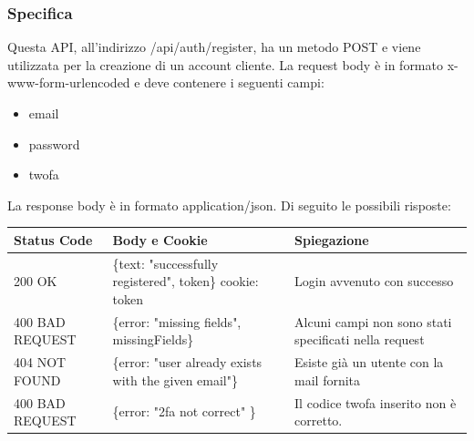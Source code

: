 \documentclass{report}
\begin{document}
\subsubsection*{Specifica}
Questa API, all'indirizzo /api/auth/register, ha un metodo POST e viene utilizzata per la creazione di un account cliente.
La request body è in formato x-www-form-urlencoded e deve contenere i seguenti campi:
\begin{itemize}
	\item email
	\item password
	\item twofa
\end{itemize}
La response body è in formato application/json. Di seguito le possibili risposte:
\begin{center} %
	\centering
	\begin{tabular}{ |p{4cm}|p{5cm}|p{4cm}| }
		\hline
		\centering Status Code & \qquad\quad Body e Cookie                                & \qquad\qquad Spiegazione                              \\ %
		\hline
		200 OK                 & \{text: "successfully registered", token\} cookie: token & Login avvenuto con successo                           \\
		\hline
		400 BAD REQUEST        & \{error: "missing fields", missingFields\}               & Alcuni campi non sono stati specificati nella request \\ %
		\hline
		404 NOT FOUND          & \{error: "user already exists with the given email"\}    & Esiste già un utente con la mail fornita              \\%
		\hline
		400 BAD REQUEST        & \{error: "2fa not correct" \}                            & Il codice twofa inserito non è corretto.              \\
		\hline
	\end{tabular}
\end{center}
\end{document}
